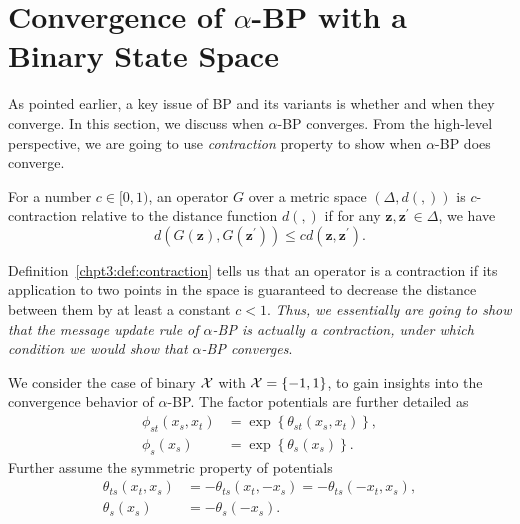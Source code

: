 \section{Convergence of $\alpha$-BP with a Binary State Space}\label{chpt3:sec:cnvg-thm}

As pointed earlier, a key issue of BP and its variants is whether and when they converge. In this section, we discuss when $\alpha$-BP converges. 
From the high-level perspective, we are going to use \textit{contraction} property to show when $\alpha$-BP does converge.
\begin{definition}\label{chpt3:def:contraction}
  For a number $c \in [0,1)$, an operator $G$ over a metric space $(\Delta, d(,))$ is $c$-contraction relative to the distance function $d(,)$ if for any $\bm{z}, \bm{z}^{\prime} \in \Delta$, we have
  \begin{equation}
    d(G(\bm{z}), G(\bm{z}^{\prime})) \leq c d(\bm{z}, \bm{z}^{\prime}).
  \end{equation}
\end{definition}
Definition~\ref{chpt3:def:contraction} tells us that an operator is a contraction if its application to two points in the space is guaranteed to decrease the distance between them by at least a constant $c < 1$. \textit{Thus, we essentially are going to show that the message update rule of $\alpha$-BP is actually a contraction, under which condition we would show that $\alpha$-BP converges}.

We consider the case of binary $\mathcal{X}$ with $\mathcal{X}=\left\{ -1, 1 \right\}$, to gain insights into the convergence behavior of $\alpha$-BP. The factor potentials are further detailed as
\begin{align}
  \phi_{st}(x_s, x_t) &= \exp\left\{ \theta_{st}(x_s, x_t)\right\}, \nonumber \\
  \phi_{s}(x_s) &= \exp\left\{ \theta_{s}(x_s) \right\}.
\end{align}
Further assume the symmetric property of potentials
\begin{align}\label{chpt3:eq:symmetric-prop}
  \theta_{ts}(x_t, x_s) &= -\theta_{ts}(x_t, -x_s) = -\theta_{ts}(-x_t, x_s), \nonumber\\
  \theta_{s}(x_s) &= - \theta_s(-x_s).
\end{align}


